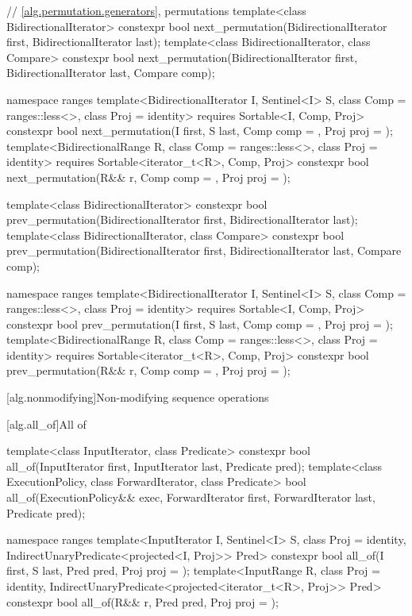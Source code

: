 \begin{codeblock}
{  // \ref{alg.permutation.generators}, permutations
  template<class BidirectionalIterator>
    constexpr bool next_permutation(BidirectionalIterator first,
                                    BidirectionalIterator last);
  template<class BidirectionalIterator, class Compare>
    constexpr bool next_permutation(BidirectionalIterator first,
                                    BidirectionalIterator last, Compare comp);

  namespace ranges {
    template<BidirectionalIterator I, Sentinel<I> S, class Comp = ranges::less<>,
             class Proj = identity>
      requires Sortable<I, Comp, Proj>
      constexpr bool
        next_permutation(I first, S last, Comp comp = {}, Proj proj = {});
    template<BidirectionalRange R, class Comp = ranges::less<>,
             class Proj = identity>
      requires Sortable<iterator_t<R>, Comp, Proj>
      constexpr bool
        next_permutation(R&& r, Comp comp = {}, Proj proj = {});
  }

  template<class BidirectionalIterator>
    constexpr bool prev_permutation(BidirectionalIterator first,
                                    BidirectionalIterator last);
  template<class BidirectionalIterator, class Compare>
    constexpr bool prev_permutation(BidirectionalIterator first,
                                    BidirectionalIterator last, Compare comp);

  namespace ranges {
    template<BidirectionalIterator I, Sentinel<I> S, class Comp = ranges::less<>,
             class Proj = identity>
      requires Sortable<I, Comp, Proj>
      constexpr bool
        prev_permutation(I first, S last, Comp comp = {}, Proj proj = {});
    template<BidirectionalRange R, class Comp = ranges::less<>,
             class Proj = identity>
      requires Sortable<iterator_t<R>, Comp, Proj>
      constexpr bool
        prev_permutation(R&& r, Comp comp = {}, Proj proj = {});
  }
}
\end{codeblock}

[alg.nonmodifying]{Non-modifying sequence operations}

[alg.all_of]{All of}

%
\begin{itemdecl}
template<class InputIterator, class Predicate>
  constexpr bool all_of(InputIterator first, InputIterator last, Predicate pred);
template<class ExecutionPolicy, class ForwardIterator, class Predicate>
  bool all_of(ExecutionPolicy&& exec, ForwardIterator first, ForwardIterator last,
              Predicate pred);

namespace ranges {
  template<InputIterator I, Sentinel<I> S, class Proj = identity,
           IndirectUnaryPredicate<projected<I, Proj>> Pred>
    constexpr bool all_of(I first, S last, Pred pred, Proj proj = {});
  template<InputRange R, class Proj = identity,
           IndirectUnaryPredicate<projected<iterator_t<R>, Proj>> Pred>
    constexpr bool all_of(R&& r, Pred pred, Proj proj = {});
}
\end{itemdecl}

